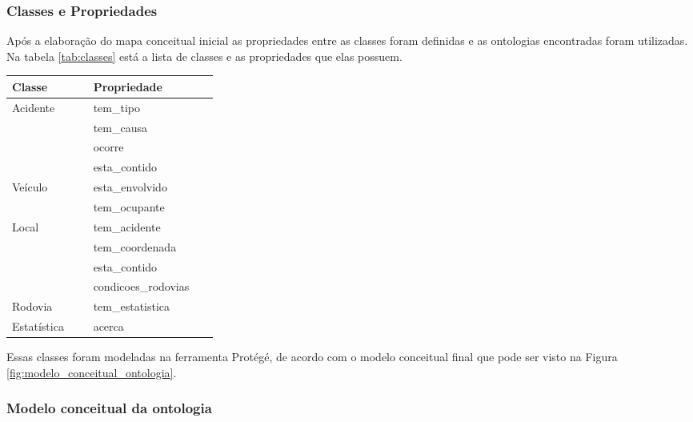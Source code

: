\subsubsection{Classes e Propriedades}

Após a elaboração do mapa conceitual inicial as propriedades entre as classes foram definidas e as ontologias encontradas foram utilizadas. 
Na tabela \ref{tab:classes} está a lista de classes
e as propriedades que elas possuem.      

\begin{table*}[!h]
\centering
\caption{Classes e Propriedades}
\label{tab:classes}
 \begin{tabular}{p{0.15\linewidth}p{0.15\linewidth}}
  \hline
  Classe & Propriedade \\
  \hline
    Acidente & tem\_tipo\\
      & tem\_causa\\
      & ocorre\\
      & esta\_contido\\
      \hline
  Veículo & esta\_envolvido\\
    & tem\_ocupante\\
    \hline
  Local & tem\_acidente\\
    & tem\_coordenada\\
    & esta\_contido\\
    & condicoes\_rodovias\\
  \hline
  Rodovia & tem\_estatistica\\
  \hline
  Estatística & acerca\\
  \hline
 \end{tabular}

\end{table*}

Essas classes foram modeladas na ferramenta Protégé\footnotemark[2], de acordo com o modelo conceitual final que pode ser visto na Figura \ref{fig:modelo_conceitual_ontologia}.

	
    \subsubsection{Modelo conceitual da ontologia}
    
      
    
      
  

  